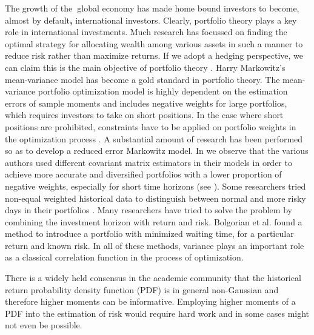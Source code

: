 \documentclass[ aip,jmp,reprint]{revtex4-2}
\begin{document}
The growth of the\textbf{\ }global economy has made home bound investors to
become, almost by default\textbf{, }international investors. Clearly,
portfolio theory plays a key role in international investments. Much
research has focussed on finding the optimal strategy for allocating wealth
among various assets in such a manner to reduce risk rather than maximize
returns. If we adopt a hedging perspective, we can claim this is the main
objective of portfolio theory \cite{Jorion}. Harry Markowitz's mean-variance
model \cite{Mark1}\cite{Mark2} has become a gold standard in portfolio
theory. The mean-variance portfolio optimization model is highly dependent
on the estimation errors of sample moments and includes negative weights for
large portfolios, which requires investors to take on short positions. In
the case where short positions are prohibited, constraints have to be
applied on portfolio weights in the optimization process \cite{Best}\cite%
{Green}\cite{Jagannathan}. A substantial amount of research has been
performed so as to develop a reduced error Markowitz model. In \cite{Ledoit}%
\cite{Laloux}\cite{Plerou}\cite{Rosenow}\cite{Potters}\cite{Anderberg} we
observe that the various authors used different covariant matrix estimators
in their models in order to achieve more accurate and diversified portfolios
with a lower proportion of negative weights, especially for short time
horizons (see \cite{Kondor}\cite{Pafka}). Some researchers tried non-equal
weighted historical data to distinguish between normal and more risky days
in their portfolios \cite{Coelho}. Many researchers have tried to solve the
problem by combining the investment horizon with return and risk. Bolgorian
et al.\cite{Bolgorian} found a method to introduce a portfolio with
minimized waiting time, for a particular return and known risk. In all of
these methods, variance plays an important role as a classical correlation
function in the process of optimization.

There is a widely held consensus in the academic community that the
historical return probability density function (PDF) is in general
non-Gaussian and therefore higher moments can be informative. Employing
higher moments of a PDF into the estimation of risk would require hard work
and in some cases might not even be possible.
\end{document}
